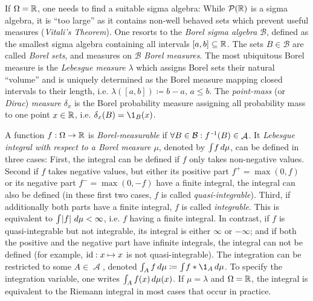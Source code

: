 \documentclass[a4paper]{scrreprt}
\DeclareMathOperator{\A}{\mathcal{A}}
\newcommand{\B}{\mathcal{B}}
\begin{document}
    If $\Omega = \mathbb{R}$, one needs to find a suitable sigma algebra: While $\operatorname{\mathcal{P}}(\mathbb{R})$ is a sigma algebra, it is “too large” as it contains non-well behaved sets which prevent useful measures (\emph{Vitali's Theorem}).
    One resorts to the \emph{Borel sigma algebra} $\B$, defined as the smallest sigma algebra containing all intervals $[a, b] \subseteq \mathbb{R}$.
    The sets $B \in \B$ are called \emph{Borel sets}, and measures on $\B$ \emph{Borel measures}.
    The most ubiquitous Borel measure is the \emph{Lebesgue measure} $\lambda$ which assigns Borel sets their natural “volume” and is uniquely determined as the Borel measure mapping closed intervals to their length, i.e. $\lambda([a, b]) \coloneqq b-a$, $a \leq b$.
    The \emph{point-mass} (or \emph{Dirac}) \emph{measure} $\delta_x$ is the Borel probability measure assigning all probability mass to one point $x \in \mathbb{R}$, i.e. $\delta_x(B) = \1_B(x)$.

    A function $f: \Omega \to \mathbb{R}$ is \emph{Borel-measurable} if $\forall B \in \B: f\inv(B) \in \A$.
    It \emph{Lebesgue integral with respect to a Borel measure $\mu$}, denoted by $\int_{} f \, d\mu$, can be defined in three cases:
    First, the integral can be defined if $f$ only takes non-negative values.
    Second if $f$ takes negative values, but either its positive part $f^+ = \max(0, f)$ or its negative part $f^- = \max(0, -f)$ have a finite integral, the integral can also be defined (in these first two cases, $f$ is called \emph{quasi-integrable}).
    Third, if additionally both parts have a finite integral, $f$ is called \emph{integrable}. This is equivalent to $\int_{} \left| f \right| \, d\mu < \infty$, i.e. $f$ having a finite integral.
    In contrast, if $f$ is quasi-integrable but not integrable, its integral is either $\infty$ or $-\infty$; and if both the positive and the negative part have infinite integrals, the integral can not be defined (for example, $\operatorname{id}: x \mapsto x$ is not quasi-integrable).
    The integration can be restricted to some $A \in \A$, denoted $\lintegral{A}{f}{\mu} \coloneqq \lintegral{}{f*\1_A}{\mu}$. To specify the integration variable, one writes $\int_{A} f(x) \, d\mu(x)$.
    If $\mu = \lambda$ and $\Omega = \mathbb{R}$, the integral is equivalent to the Riemann integral in most cases that occur in practice.
    
    
\end{document}

